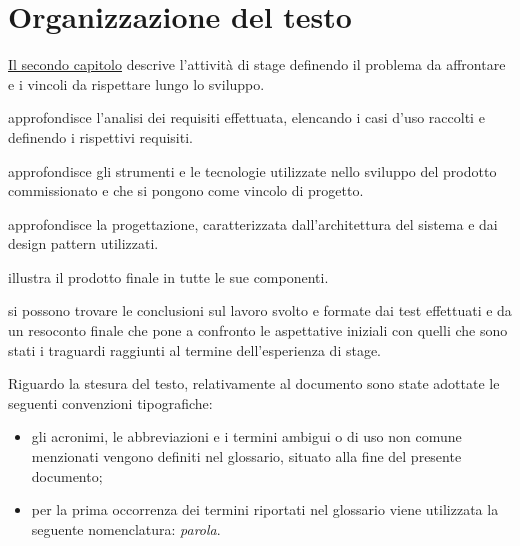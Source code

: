 \section{Organizzazione del testo}


{\hyperref[cap:descrizione-stage]{Il secondo capitolo}} descrive l'attività di stage definendo il problema da affrontare e i vincoli da rispettare lungo lo sviluppo.
    
 approfondisce l'analisi dei requisiti effettuata, elencando i casi d'uso raccolti e definendo i rispettivi requisiti.
    
 approfondisce gli strumenti e le tecnologie utilizzate nello sviluppo del prodotto commissionato e che si pongono come vincolo di progetto.
    
 approfondisce la progettazione, caratterizzata dall'architettura del sistema e dai design pattern utilizzati.
    
 illustra il prodotto finale in tutte le sue componenti.
    
 si possono trovare le conclusioni sul lavoro svolto e formate dai test effettuati e da un resoconto finale che pone a confronto le aspettative iniziali con quelli che sono stati i traguardi raggiunti al termine dell'esperienza di stage.

\noindent Riguardo la stesura del testo, relativamente al documento sono state adottate le seguenti convenzioni tipografiche:
\begin{itemize}
	\item gli acronimi, le abbreviazioni e i termini ambigui o di uso non comune menzionati vengono definiti nel glossario, situato alla fine del presente documento;
	\item per la prima occorrenza dei termini riportati nel glossario viene utilizzata la seguente nomenclatura: \emph{parola}\glsfirstoccur.
\end{itemize}
